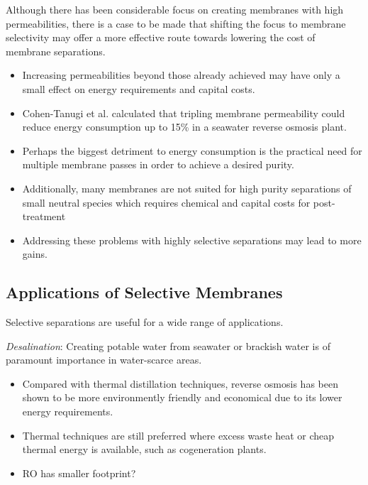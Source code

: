   Although there has been considerable focus on creating membranes with high
  permeabilities, there is a case to be made that shifting the focus to membrane
  selectivity may offer a more effective route towards lowering the cost of 
  membrane separations.
  \begin{itemize}
    \item Increasing permeabilities beyond those already achieved may have 
    only a small effect on energy requirements and capital costs. 
    \item Cohen-Tanugi et al. calculated that tripling membrane permeability
    could reduce energy consumption up to 15\% in a seawater reverse osmosis plant.~\cite{cohen-tanugi_quantifying_2014}
    \item Perhaps the biggest detriment to energy consumption is the practical
	need for multiple membrane passes in order to achieve a desired purity.
    \item Additionally, many membranes are not suited for high purity separations
    of small neutral species which requires chemical and capital costs for
    post-treatment
    \item Addressing these problems with highly selective separations may lead to 
    more gains.
  \end{itemize} 
  
  
  \subsection{Applications of Selective Membranes}
  
  Selective separations are useful for a wide range of applications.  
  
  \textit{Desalination}:
  Creating potable water from seawater or brackish water is of paramount importance
  in water-scarce areas. 
  \begin{itemize}
  	\item Compared with thermal distillation techniques, reverse osmosis has been 
  	shown to be more environmently friendly and economical due to its lower energy
  	requirements.
  	\item Thermal techniques are still preferred where excess waste heat or cheap 
  	thermal energy is available, such as cogeneration plants.
  	\item RO has smaller footprint?
  \end{itemize}

